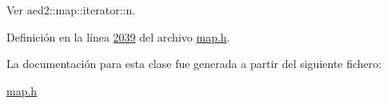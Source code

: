 \-Ver aed2\-::map\-::iterator\-::n. 



\-Definición en la línea \hyperlink{map_8h_source_l02039}{2039} del archivo \hyperlink{map_8h_source}{map.\-h}.



\-La documentación para esta clase fue generada a partir del siguiente fichero\-:\begin{DoxyCompactItemize}
\item 
\hyperlink{map_8h}{map.\-h}\end{DoxyCompactItemize}
